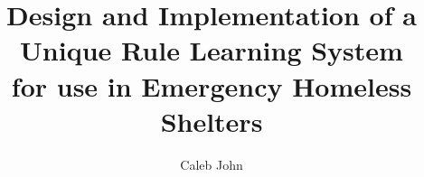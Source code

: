 \documentclass{ucalgarythesis}
\theoremstyle{plain}
\theoremstyle{definition}
\newcommand{\Abb}[0]{RuGRATS }
\begin{document}


  \title{
  Design and Implementation of a Unique Rule Learning System \\for use in Emergency Homeless Shelters
   }
   
  \author{Caleb John}
  

  \frontmatter           %
  \makethesistitle       %


\end{document}
